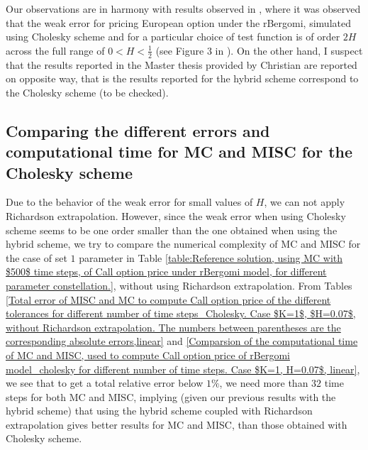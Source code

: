 \documentclass[11pt]{article}
\begin{document}
\begin{remark}
Our observations are in harmony with results observed in \cite{bayer2017regularity}, where it was observed that the weak error for pricing European option under the rBergomi, simulated using Cholesky scheme and for a particular choice of test function is of order $2H$ across the full range of $0<H <\frac{1}{2}$ (see Figure $3$ in \cite{bayer2017regularity}). On the other hand, I suspect  that the results reported in the Master thesis provided by Christian are reported on opposite way, that is the results reported for the hybrid scheme correspond to the Cholesky scheme (to be checked). 
\end{remark}


\subsection{Comparing the different  errors and computational time for MC and MISC for the Cholesky scheme}\label{sec:Comparing different  errors and complexity for MC and MISC_ Cholesky}
Due to the behavior of the weak error for small values of $H$, we can not apply Richardson extrapolation. However, since the weak error when using Cholesky scheme seems to be one order smaller than the one obtained when using the hybrid scheme, we try to compare the numerical complexity of MC and MISC for the case of set $1$ parameter in Table \ref{table:Reference solution, using MC with $500$ time steps, of Call option price under rBergomi model, for different parameter constellation.}, without using Richardson extrapolation. From Tables \ref{Total error of MISC and MC to compute Call option price of the different tolerances for different number of time steps_Cholesky. Case $K=1$, $H=0.07$, without Richardson extrapolation. The numbers between parentheses are the corresponding absolute errors,linear} and \ref{Comparsion of the computational time of  MC and MISC, used to compute Call option price of rBergomi model_cholesky for different number of time steps. Case $K=1, H=0.07$, linear}, we see that to get a total relative error below $1\%$, we need more than $32$ time steps for both MC and MISC, implying (given our previous results with the hybrid scheme) that using the hybrid scheme coupled with Richardson extrapolation gives better results for MC and MISC, than those obtained with Cholesky scheme.
\FloatBarrier
\end{document}
